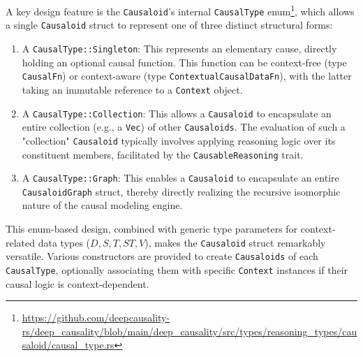 A key design feature is the \texttt{Causaloid}'s internal \texttt{CausalType} enum\footnote{\url{https://github.com/deepcausality-rs/deep_causality/blob/main/deep_causality/src/types/reasoning_types/causaloid/causal_type.rs}}, which allows a single \texttt{Causaloid} struct to represent one of three distinct structural forms:
\begin{enumerate}
    \item A \texttt{CausalType::Singleton}: This represents an elementary cause, directly holding an optional causal function. This function can be context-free (type \texttt{CausalFn}) or context-aware (type \texttt{ContextualCausalDataFn}), with the latter taking an immutable reference to a \texttt{Context} object.
    \item A \texttt{CausalType::Collection}: This allows a \texttt{Causaloid} to encapsulate an entire collection (e.g., a \texttt{Vec}) of other \texttt{Causaloids}. The evaluation of such a "collection" \texttt{Causaloid} typically involves applying reasoning logic over its constituent members, facilitated by the \texttt{CausableReasoning} trait.
    \item A \texttt{CausalType::Graph}: This enables a \texttt{Causaloid} to encapsulate an entire \texttt{CausaloidGraph} struct, thereby directly realizing the recursive isomorphic nature of the causal modeling engine.
\end{enumerate}
This enum-based design, combined with generic type parameters for context-related data types ($D, S, T, ST, V$), makes the \texttt{Causaloid} struct remarkably versatile. Various constructors are provided to create \texttt{Causaloids} of each \texttt{CausalType}, optionally associating them with specific \texttt{Context} instances if their causal logic is context-dependent.

